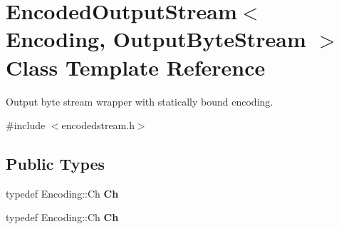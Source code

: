 \hypertarget{classEncodedOutputStream}{}\section{Encoded\+Output\+Stream$<$ Encoding, Output\+Byte\+Stream $>$ Class Template Reference}
\label{classEncodedOutputStream}


Output byte stream wrapper with statically bound encoding.  




{\ttfamily \#include $<$encodedstream.\+h$>$}

\subsection*{Public Types}
\begin{DoxyCompactItemize}
\item 
\mbox{\label{classEncodedOutputStream_aa8f494d7ee2808307fbc9cd658c0f760}} 
typedef Encoding\+::\+Ch {\bfseries Ch}
\item 
\mbox{\label{classEncodedOutputStream_aa8f494d7ee2808307fbc9cd658c0f760}} 
typedef Encoding\+::\+Ch {\bfseries Ch}
\end{DoxyCompactItemize}
